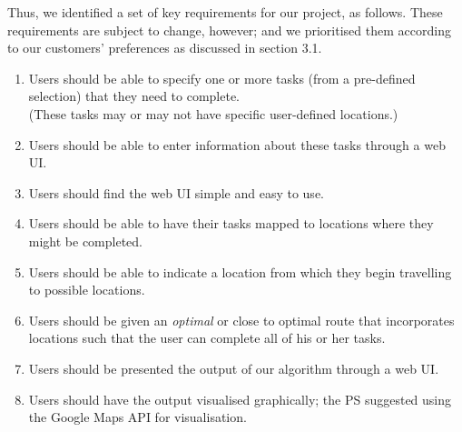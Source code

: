 \documentclass[a4paper, 10pt]{article}
\begin{document}
Thus, we identified a set of key requirements for our project, as follows. These requirements are subject to change, however; and we prioritised them according to our customers' preferences as discussed in section 3.1.
\begin{enumerate}
\item Users should be able to specify one or more tasks (from a pre-defined selection) that they need to complete. \\(These tasks may or may not have specific user-defined locations.)
\item Users should be able to enter information about these tasks through a web UI.
\item Users should find the web UI simple and easy to use.
\item Users should be able to have their tasks mapped to locations where they might be completed.
\item Users should be able to indicate a location from which they begin travelling to possible locations.
\item Users should be given an \textit{optimal} or close to optimal route that incorporates locations such that the user can complete all of his or her tasks. 
\item Users should be presented the output of our algorithm through a web UI.
\item Users should have the output visualised graphically; the PS suggested using the Google Maps API for visualisation.
\end{enumerate}
\newpage
\end{document}
